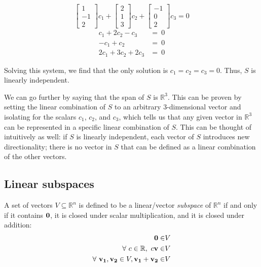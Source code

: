\documentclass[../main.tex]{subfiles}
\begin{document}
\begin{solution}
	\[\begin{bmatrix} 1 \\ -1 \\ 2 \end{bmatrix}c_1
		+ \begin{bmatrix} 2 \\ 1 \\ 3 \end{bmatrix}c_2
		+ \begin{bmatrix} -1 \\ 0 \\ 2 \end{bmatrix}c_3 = 0\]
	\begin{align*}
		c_1+2c_2-c_3   & =    \ 0     \\
		-c_1+c_2       & =        \ 0 \\
		2c_1+3c_2+2c_3 & =  \ 0
	\end{align*}

	Solving this system, we find that the only solution is
	$c_1=c_2=c_3=0$. Thus, $S$ is linearly independent. \qedsymbol
\end{solution}

We can go further by saying that the span of $S$ is $\mathbb{R}^3$. This
can be proven by setting the linear combination of $S$ to an
arbitrary 3-dimensional vector and isolating for the scalars $c_1$, $c_2$, and $c_3$,
which tells us that any given vector in $\mathbb{R}^3$ can be represented
in a specific linear combination of $S$. This can be thought of intuitively as well:
if $S$ is linearly independent, each vector of $S$ introduces
new directionality; there is no vector in $S$ that can be defined as a linear
combination of the other vectors.

\subsection{Linear subspaces}

\begin{definition}
	A set of vectors $V \subseteq \mathbb{R}^n$ is defined to be a linear/vector \textit{subspace}
	of $\mathbb{R}^n$ if and only if it contains $\mathbf{0}$,
	it is closed under scalar multiplication, and it is closed under addition:
	\begin{align*}
		\mathbf{0} \in                                                       & V \\
		\forall\ c \in \mathbb{R},\ c\mathbf{v} \in                          & V \\
		\forall\ \mathbf{v_1}, \mathbf{v_2} \in V, \mathbf{v_1} + \mathbf{v_2} \in & V
	\end{align*}
\end{definition}
\end{document}
